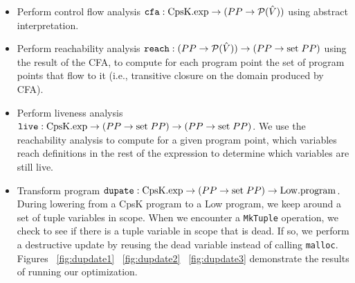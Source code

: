 \documentclass{article}
\begin{document}
\begin{itemize}
\item Perform control flow analysis ${\tt cfa} : {\rm CpsK.exp} \rightarrow (PP \rightarrow \mathcal{P}(\hat{V}))$ using abstract interpretation. 
\item Perform reachability analysis ${\tt reach} : (PP \rightarrow \mathcal{P}(\hat{V})) \rightarrow (PP \rightarrow {\rm set} \; PP)$ using the result of the CFA, to compute for each program point the set of program points that flow to it (i.e., transitive closure on the domain produced by CFA).
\item Perform liveness analysis ${\tt live} : {\rm CpsK.exp} \rightarrow (PP \rightarrow {\rm set} \; PP) \rightarrow (PP \rightarrow {\rm set} \; PP)$. We use the reachability analysis to compute for a given program point, which variables reach definitions in the rest of the expression to determine which variables are still live. 
\item Transform program ${\tt dupate} : {\rm CpsK.exp} \rightarrow (PP \rightarrow {\rm set} \; PP) \rightarrow {\rm Low.program}$. During lowering from a CpsK program to a Low program, we keep around a set of tuple variables in scope. When we encounter a {\tt MkTuple} operation, we check to see if there is a tuple variable in scope that is dead. If so, we perform a destructive update by reusing the dead variable instead of calling {\tt malloc}. Figures ~\ref{fig:dupdate1} ~\ref{fig:dupdate2} ~\ref{fig:dupdate3} demonstrate the results of running our optimization.
\end{itemize}
\end{document}
